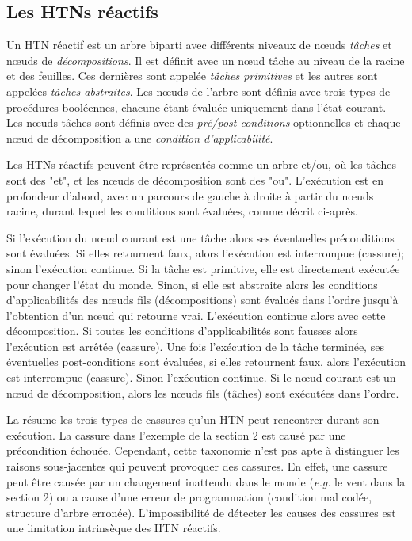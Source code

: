\documentclass[a4paper,twoside,french]{article}
\begin{document}
		\subsection{Les HTNs réactifs}
		Un HTN réactif est un arbre biparti avec  différents niveaux de  n\oe uds {\em tâches} et   n\oe uds de {\em décompositions}. Il est définit avec un n\oe ud tâche au niveau de la racine et des feuilles. Ces dernières sont appelée {\em tâches primitives} et les autres sont appelées {\em tâches abstraites}. Les n\oe uds de l'arbre sont définis avec trois types de procédures booléennes, chacune étant évaluée uniquement dans l'état courant. Les n\oe uds tâches sont définis avec des {\em pré/post-conditions} optionnelles et chaque n\oe ud de décomposition a une {\em condition d'applicabilité}.
		\par Les HTNs réactifs peuvent être représentés comme un arbre et/ou, où les tâches sont des "et", et les n\oe uds de décomposition sont des "ou". L'exécution est en profondeur d'abord, avec un parcours de gauche à droite à partir du n\oe uds racine, durant lequel les conditions sont évaluées, comme décrit ci-après. 
		\par Si l'exécution du n\oe ud courant est une tâche alors ses éventuelles préconditions sont évaluées. Si elles retournent faux, alors l'exécution est interrompue (cassure); sinon l'exécution continue. Si la tâche est primitive, elle est directement exécutée pour changer l'état du monde. Sinon, si elle est abstraite alors les conditions d'applicabilités des n\oe uds fils (décompositions) sont évalués dans l'ordre jusqu'à l'obtention d'un n\oe ud qui retourne vrai. L'exécution continue alors avec cette décomposition. Si toutes les conditions d'applicabilités sont fausses alors  l'exécution est arrêtée (cassure). Une fois l'exécution de la tâche terminée, ses éventuelles post-conditions sont évaluées, si elles retournent faux, alors l'exécution est interrompue (cassure). Sinon l'exécution continue. Si le n\oe ud courant est un n\oe ud de décomposition, alors les n\oe uds fils (tâches) sont exécutées dans l'ordre. 
		\par La  résume les trois types de cassures qu'un HTN peut rencontrer durant son exécution. La cassure dans l'exemple de la section 2 est causé par une précondition échouée. Cependant, cette taxonomie n'est pas apte à distinguer les raisons sous-jacentes qui peuvent provoquer des cassures. En effet, une cassure peut être causée par un changement inattendu dans le monde (\emph{e.g.} le vent dans la section 2) ou a cause d'une erreur de programmation (condition mal codée, structure d'arbre erronée). L'impossibilité de détecter les causes des cassures est une limitation intrinsèque des HTN réactifs.
\end{document}
